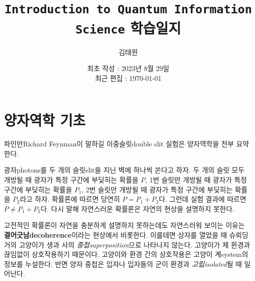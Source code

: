 \documentclass[a4paper,chapter,atbegshi]{oblivoir}
\title{\texttt{Introduction to Quantum Information Science} 학습일지}
\author{김태원}
\date{최초 작성 : 2023년 8월 29일 \\ 최근 편집 : \today}
\begin{document}
\maketitle
\break
\tableofcontents
\chapter{양자역학 기초}
파인만{\tiny Richard Feynman}이 말하길 이중슬릿{\tiny double slit} 실험은
양자역학을 전부 요약한다. 

광자{\tiny photons}를 두 개의 슬릿{\tiny slit}을 지닌 벽에 하나씩 쏜다고 하자.
두 개의 슬릿 모두 개방될 때 광자가 특정 구간에 부딪히는 확률을 $P$, 1번 슬릿만
개방될 때 광자가 특정 구간에 부딪히는 확률을 $P_1$, 2번 슬릿만 개방될 때 광자가
특정 구간에 부딪히는 확률을 $P_2$라고 하자. 확률론에 따르면 당연히 $P=P_1+P_2$다.
그런데 실험 결과에 따르면 $P\neq P_1+P_2$다. 다시 말해 자연스러운 확률론은 자연의 
현상을 설명하지 못한다.

고전적인 확률론이 자연을 충분하게 설명하지 못하는데도 자연스러워 보이는 이유는 
\textbf{결어긋남\tiny decoherence}이라는 현상에서 비롯한다. 이를테면 상자를
열었을 때 슈뢰딩거의 고양이가 생과 사의 \emph{중첩\tiny superposition}으로
나타나지 않는다. 고양이가 제 환경과 끊임없이 상호작용하기 때문이다. 고양이와
환경 간의 상호작용은 고양이 계{\tiny system}의 정보를 누설한다. 반면 양자
중첩은 입자나 입자들의 군이 환경과 \emph{고립\tiny isolated}될 때 일어난다.
\end{document}
